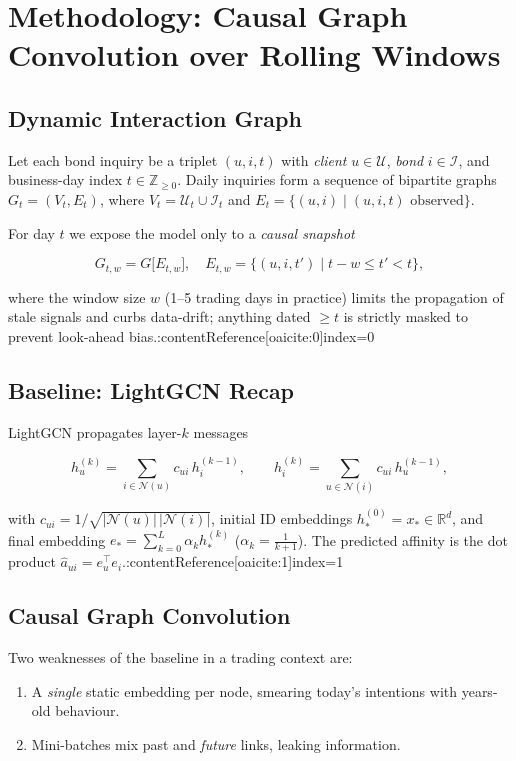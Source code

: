 \documentclass{article}
\begin{document}
\section*{Methodology: Causal Graph Convolution over Rolling Windows}

\subsection*{Dynamic Interaction Graph}

Let each bond inquiry be a triplet $(u,i,t)$ with {\em client}  
$u\!\in\!\mathcal U$, {\em bond} $i\!\in\!\mathcal I$, and business-day index  
$t\!\in\!\mathbb Z_{\ge0}$.  Daily inquiries form a sequence of bipartite
graphs $G_t=(V_t,E_t)$, where  
$V_t=\mathcal U_t\cup\mathcal I_t$ and  
$E_t=\{(u,i)\mid(u,i,t)\text{ observed}\}$.

For day $t$ we expose the model only to a {\em causal snapshot}

\[
G_{t,w}=G\bigl[E_{t,w}\bigr], \quad
E_{t,w}=\{(u,i,t')\mid t-w\le t'<t\},
\]

where the window size $w$ (1–5 trading days in practice) limits the
propagation of stale signals and curbs data-drift; anything dated
$\ge t$ is strictly masked to prevent look-ahead bias.:contentReference[oaicite:0]{index=0}

\subsection*{Baseline: LightGCN Recap}

LightGCN propagates layer-$k$ messages

\[
h^{(k)}_u=\!\!\sum_{i\in\mathcal N(u)}\!\!c_{ui}\,h^{(k-1)}_i,
\qquad
h^{(k)}_i=\!\!\sum_{u\in\mathcal N(i)}\!\!c_{ui}\,h^{(k-1)}_u,
\]

with $c_{ui}=1/\!\sqrt{|\mathcal N(u)|\,|\mathcal N(i)|}$,
initial ID embeddings $h^{(0)}_\ast=x_\ast\in\mathbb R^d$, and
final embedding $e_\ast=\sum_{k=0}^L\alpha_k h^{(k)}_\ast$
($\alpha_k=\tfrac1{k+1}$).  The predicted affinity is the dot product
$\hat a_{ui}=e_u^{\!\top}e_i$.:contentReference[oaicite:1]{index=1}

\subsection*{Causal Graph Convolution}

Two weaknesses of the baseline in a trading context are:

\begin{enumerate}
  \item A {\em single} static embedding per node, smearing today’s
        intentions with years-old behaviour.
  \item Mini-batches mix past and {\em future} links, leaking information.
\end{enumerate}
\end{document}
